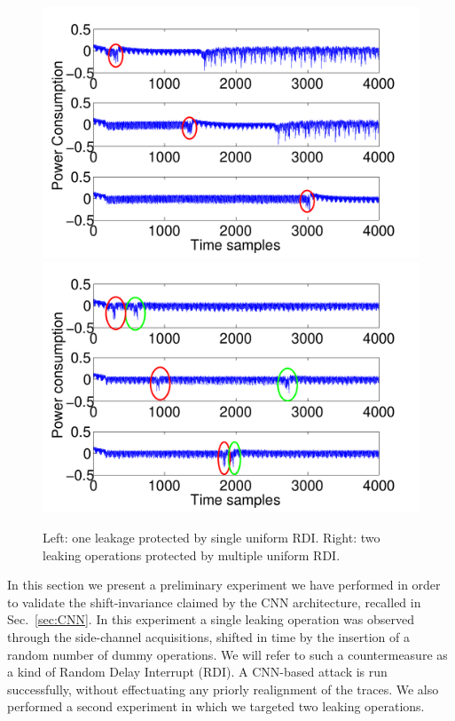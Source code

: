 \begin{figure}
\includegraphics[width=.5\textwidth]{../Figures/CHES2017/CW_shift_traces.pdf} 
\includegraphics[width=.5\textwidth]{../Figures/CHES2017/CW_double_shift_traces.pdf} 
\caption{Left: one leakage protected by single uniform RDI. Right: two leaking operations protected by multiple uniform RDI.}\label{fig:CW_shift_traces}
\end{figure}

In this section we present a preliminary  experiment we have performed in order to validate the shift-invariance claimed by the CNN architecture, recalled in Sec.~\ref{sec:CNN}. In this experiment a single leaking operation was observed through the side-channel acquisitions, shifted in time by the insertion of a random number of dummy operations. We will refer to such a countermeasure as a kind of Random Delay Interrupt (RDI).  A CNN-based attack is run successfully, without effectuating any priorly realignment of the traces. We also performed a second experiment in which we targeted two leaking operations.\\

